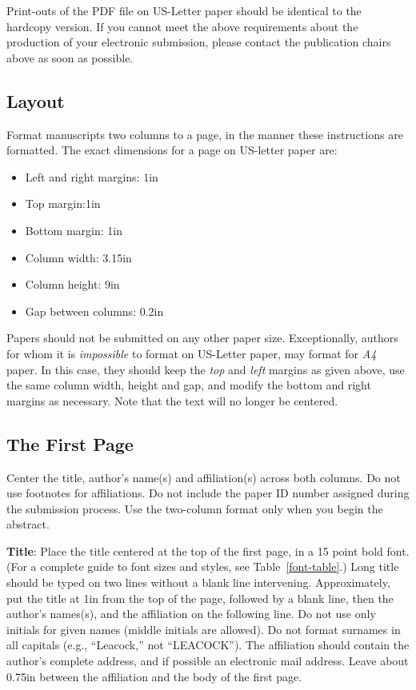 \documentclass[11pt,letterpaper]{article}
\begin{document}
Print-outs of the PDF file on US-Letter paper should be identical to the
hardcopy version.  If you cannot meet the above requirements about the
production of your electronic submission, please contact the
publication chairs above  as soon as possible.


\subsection{Layout}
\label{ssec:layout}

Format manuscripts two columns to a page, in the manner these
instructions are formatted. The exact dimensions for a page on US-letter
paper are:

\begin{itemize}
\item Left and right margins: 1in
\item Top margin:1in
\item Bottom margin: 1in
\item Column width: 3.15in
\item Column height: 9in
\item Gap between columns: 0.2in
\end{itemize}

\noindent Papers should not be submitted on any other paper size. Exceptionally,
authors for whom it is \emph{impossible} to format on US-Letter paper,
may format for \emph{A4} paper. In this case, they should keep the \emph{top}
and \emph{left} margins as given above, use the same column width,
height and gap, and modify the bottom and right margins as necessary.
Note that the text will no longer be centered.

\subsection{The First Page}
\label{ssec:first}

Center the title, author's name(s) and affiliation(s) across both
columns. Do not use footnotes for affiliations.  Do not include the
paper ID number assigned during the submission process.
Use the two-column format only when you begin the abstract.

{\bf Title}: Place the title centered at the top of the first page, in
a 15 point bold font.  (For a complete guide to font sizes and styles, see Table~\ref{font-table}.)
Long title should be typed on two lines without
a blank line intervening. Approximately, put the title at 1in from the
top of the page, followed by a blank line, then the author's names(s),
and the affiliation on the following line.  Do not use only initials
for given names (middle initials are allowed). Do not format surnames
in all capitals (e.g., ``Leacock,'' not ``LEACOCK'').  The affiliation should
contain the author's complete address, and if possible an electronic
mail address. Leave about 0.75in between the affiliation and the body
of the first page.
\end{document}
